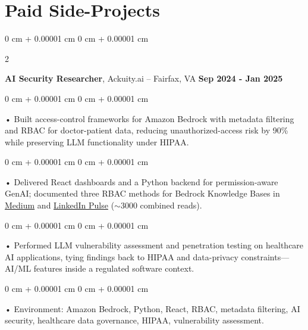 \documentclass[10pt, letterpaper]{article}
\newenvironment{onecolentry}{
    \begin{adjustwidth}{
        0 cm + 0.00001 cm
    }{
        0 cm + 0.00001 cm
    }
}{
    \end{adjustwidth}
} %
\newenvironment{twocolentry}[2][]{
    \onecolentry
    \def\secondColumn{#2}
    \setcolumnwidth{\fill, 4.5 cm}
    \begin{paracol}{2}
}{
    \switchcolumn \raggedleft \secondColumn
    \end{paracol}
    \endonecolentry
} %
\begin{document}
    \vspace{0.4cm}
    \section{Paid Side-Projects}
            \vspace{2 pt }
                    \begin{twocolentry}{
            \textbf{Sep 2024 - Jan 2025}
        }
            \textbf{AI Security Researcher}, Ackuity.ai -- Fairfax, VA\end{twocolentry}

        \begin{onecolentry}
             • Built access-control frameworks for Amazon Bedrock with metadata filtering and RBAC for doctor-patient data, reducing unauthorized-access risk by 90\% while preserving LLM functionality under HIPAA.
        \end{onecolentry}
        \begin{onecolentry}
             • Delivered React dashboards and a Python backend for permission-aware GenAI; documented three RBAC methods for Bedrock Knowledge Bases in \href{https://medium.com/@sreenikethaathreya/building-a-permission-aware-genai-application-on-amazon-bedrock-8fdc2410dd43}{Medium} and \href{https://www.linkedin.com/pulse/building-permission-aware-genai-application-amazon-bedrock-aathreya-g7nme/}{LinkedIn Pulse} ($\sim$3000 combined reads).
        \end{onecolentry}
        \begin{onecolentry}
             • Performed LLM vulnerability assessment and penetration testing on healthcare AI applications, tying findings back to HIPAA and data-privacy constraints---AI/ML features inside a regulated software context.
        \end{onecolentry}
        \begin{onecolentry}
             • Environment: Amazon Bedrock, Python, React, RBAC, metadata filtering, AI security, healthcare data governance, HIPAA, vulnerability assessment.
        \end{onecolentry}

        \vspace{0.4cm}
\end{document}
